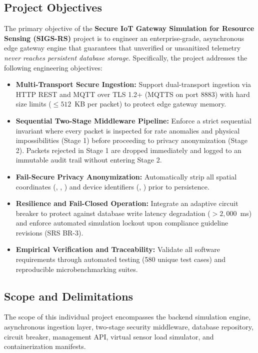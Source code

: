\documentclass[a4paper]{article}
\begin{document}
\subsection{Project Objectives}
The primary objective of the \textbf{Secure IoT Gateway Simulation for Resource Sensing (SIGS-RS)} project is to engineer an enterprise-grade, asynchronous edge gateway engine that guarantees that unverified or unsanitized telemetry \emph{never reaches persistent database storage}. Specifically, the project addresses the following engineering objectives:
\begin{itemize}
    \item \textbf{Multi-Transport Secure Ingestion:} Support dual-transport ingestion via HTTP REST and MQTT over TLS 1.2+ (MQTTS on port 8883) with hard size limits ($\le 512$~KB per packet) to protect edge gateway memory.
    \item \textbf{Sequential Two-Stage Middleware Pipeline:} Enforce a strict sequential invariant where every packet is inspected for rate anomalies and physical impossibilities (Stage 1) before proceeding to privacy anonymization (Stage 2). Packets rejected in Stage 1 are dropped immediately and logged to an immutable audit trail without entering Stage 2.
    \item \textbf{Fail-Secure Privacy Anonymization:} Automatically strip all spatial coordinates (, , ) and device identifiers (, ) prior to persistence.
    \item \textbf{Resilience and Fail-Closed Operation:} Integrate an adaptive circuit breaker to protect against database write latency degradation ($> 2,000$~ms) and enforce automated simulation lockout upon compliance guideline revisions (SRS BR-3).
    \item \textbf{Empirical Verification and Traceability:} Validate all software requirements through automated testing (580 unique test cases) and reproducible microbenchmarking suites.
\end{itemize}

\subsection{Scope and Delimitations}
The scope of this individual project encompasses the backend simulation engine, asynchronous ingestion layer, two-stage security middleware, database repository, circuit breaker, management API, virtual sensor load simulator, and containerization manifests. 
\end{document}
